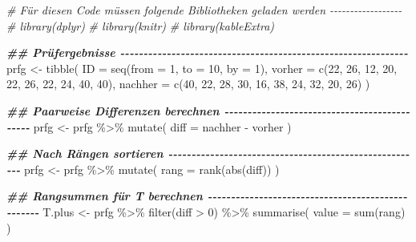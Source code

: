 \documentclass[
]{book}
\newenvironment{Shaded}{\begin{snugshade}}{\end{snugshade}}
\newcommand{\AttributeTok}[1]{\textcolor[rgb]{0.77,0.63,0.00}{#1}}
\newcommand{\CommentTok}[1]{\textcolor[rgb]{0.56,0.35,0.01}{\textit{#1}}}
\newcommand{\DecValTok}[1]{\textcolor[rgb]{0.00,0.00,0.81}{#1}}
\newcommand{\DocumentationTok}[1]{\textcolor[rgb]{0.56,0.35,0.01}{\textbf{\textit{#1}}}}
\newcommand{\FunctionTok}[1]{\textcolor[rgb]{0.00,0.00,0.00}{#1}}
\newcommand{\NormalTok}[1]{#1}
\newcommand{\OtherTok}[1]{\textcolor[rgb]{0.56,0.35,0.01}{#1}}
\newcommand{\SpecialCharTok}[1]{\textcolor[rgb]{0.00,0.00,0.00}{#1}}
\begin{document}
\begin{Shaded}
\begin{Highlighting}[]
\CommentTok{\# Für diesen Code müssen folgende Bibliotheken geladen werden {-}{-}{-}{-}{-}{-}{-}{-}{-}{-}{-}{-}{-}{-}{-}{-}{-}{-}}
\CommentTok{\# library(dplyr)}
\CommentTok{\# library(knitr)}
\CommentTok{\# library(kableExtra)}

\DocumentationTok{\#\# Prüfergebnisse {-}{-}{-}{-}{-}{-}{-}{-}{-}{-}{-}{-}{-}{-}{-}{-}{-}{-}{-}{-}{-}{-}{-}{-}{-}{-}{-}{-}{-}{-}{-}{-}{-}{-}{-}{-}{-}{-}{-}{-}{-}{-}{-}{-}{-}{-}{-}{-}{-}{-}{-}{-}{-}{-}{-}{-}{-}{-}{-}{-}{-}{-}}
\NormalTok{prfg }\OtherTok{\textless{}{-}} \FunctionTok{tibble}\NormalTok{(}
  \AttributeTok{ID =} \FunctionTok{seq}\NormalTok{(}\AttributeTok{from =} \DecValTok{1}\NormalTok{, }\AttributeTok{to =} \DecValTok{10}\NormalTok{, }\AttributeTok{by =} \DecValTok{1}\NormalTok{),}
  \AttributeTok{vorher =} \FunctionTok{c}\NormalTok{(}\DecValTok{22}\NormalTok{, }\DecValTok{26}\NormalTok{, }\DecValTok{12}\NormalTok{, }\DecValTok{20}\NormalTok{, }\DecValTok{22}\NormalTok{, }\DecValTok{26}\NormalTok{, }\DecValTok{22}\NormalTok{, }\DecValTok{24}\NormalTok{, }\DecValTok{40}\NormalTok{, }\DecValTok{40}\NormalTok{),}
  \AttributeTok{nachher =} \FunctionTok{c}\NormalTok{(}\DecValTok{40}\NormalTok{, }\DecValTok{22}\NormalTok{, }\DecValTok{28}\NormalTok{, }\DecValTok{30}\NormalTok{, }\DecValTok{16}\NormalTok{, }\DecValTok{38}\NormalTok{, }\DecValTok{24}\NormalTok{, }\DecValTok{32}\NormalTok{, }\DecValTok{20}\NormalTok{, }\DecValTok{26}\NormalTok{)}
\NormalTok{)}

\DocumentationTok{\#\# Paarweise Differenzen berechnen {-}{-}{-}{-}{-}{-}{-}{-}{-}{-}{-}{-}{-}{-}{-}{-}{-}{-}{-}{-}{-}{-}{-}{-}{-}{-}{-}{-}{-}{-}{-}{-}{-}{-}{-}{-}{-}{-}{-}{-}{-}{-}{-}{-}{-}}
\NormalTok{prfg }\OtherTok{\textless{}{-}}\NormalTok{ prfg }\SpecialCharTok{\%\textgreater{}\%} 
  \FunctionTok{mutate}\NormalTok{(}
    \AttributeTok{diff =}\NormalTok{ nachher }\SpecialCharTok{{-}}\NormalTok{ vorher}
\NormalTok{  )}

\DocumentationTok{\#\# Nach Rängen sortieren {-}{-}{-}{-}{-}{-}{-}{-}{-}{-}{-}{-}{-}{-}{-}{-}{-}{-}{-}{-}{-}{-}{-}{-}{-}{-}{-}{-}{-}{-}{-}{-}{-}{-}{-}{-}{-}{-}{-}{-}{-}{-}{-}{-}{-}{-}{-}{-}{-}{-}{-}{-}{-}{-}{-}}
\NormalTok{prfg }\OtherTok{\textless{}{-}}\NormalTok{ prfg }\SpecialCharTok{\%\textgreater{}\%} 
  \FunctionTok{mutate}\NormalTok{(}
    \AttributeTok{rang =} \FunctionTok{rank}\NormalTok{(}\FunctionTok{abs}\NormalTok{(diff))}
\NormalTok{  )}

\DocumentationTok{\#\# Rangsummen für T berechnen {-}{-}{-}{-}{-}{-}{-}{-}{-}{-}{-}{-}{-}{-}{-}{-}{-}{-}{-}{-}{-}{-}{-}{-}{-}{-}{-}{-}{-}{-}{-}{-}{-}{-}{-}{-}{-}{-}{-}{-}{-}{-}{-}{-}{-}{-}{-}{-}{-}{-}}
\NormalTok{T.plus }\OtherTok{\textless{}{-}}\NormalTok{ prfg }\SpecialCharTok{\%\textgreater{}\%} 
  \FunctionTok{filter}\NormalTok{(diff }\SpecialCharTok{\textgreater{}} \DecValTok{0}\NormalTok{) }\SpecialCharTok{\%\textgreater{}\%} 
  \FunctionTok{summarise}\NormalTok{(}
    \AttributeTok{value =} \FunctionTok{sum}\NormalTok{(rang)}
\NormalTok{  )}


\end{Highlighting}
\end{Shaded}
\end{document}
